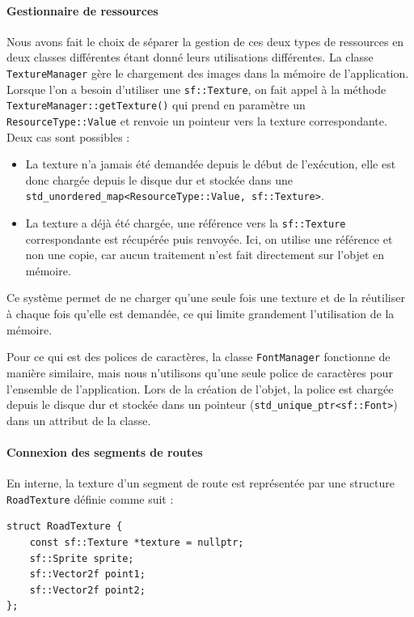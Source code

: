\paragraph{Gestionnaire de ressources}
Nous avons fait le choix de séparer la gestion de ces deux types de ressources en deux classes différentes étant donné leurs utilisations différentes.
La classe \texttt{TextureManager} gère le chargement des images dans la mémoire de l'application.
Lorsque l'on a besoin d'utiliser une \texttt{sf::Texture}\cite{sfml_sf_texture}, on fait appel à la méthode \texttt{TextureManager::getTexture()} qui prend en paramètre un \texttt{ResourceType::Value} et renvoie un pointeur vers la texture correspondante.
Deux cas sont possibles :
\begin{itemize}
    \item La texture n'a jamais été demandée depuis le début de l'exécution, elle est donc chargée depuis le disque dur et stockée dans une \texttt{\gls{std_unordered_map}<ResourceType::Value, sf::Texture>}\cite{cpp_reference_std_unordered_map}.
    \item La texture a déjà été chargée, une référence vers la \texttt{sf::Texture}\cite{sfml_sf_texture} correspondante est récupérée puis renvoyée.
    Ici, on utilise une référence et non une copie, car aucun traitement n'est fait directement sur l'objet en mémoire.
\end{itemize}
Ce système permet de ne charger qu'une seule fois une texture et de la réutiliser à chaque fois qu'elle est demandée, ce qui limite grandement l'utilisation de la mémoire.

Pour ce qui est des polices de caractères, la classe \texttt{FontManager} fonctionne de manière similaire, mais nous n'utilisons qu'une seule police de caractères pour l'ensemble de l'application.
Lors de la création de l'objet, la police est chargée depuis le disque dur et stockée dans un pointeur (\texttt{\gls{std_unique_ptr}<sf::Font>}\cite{cpp_reference_std_unique_ptr}) dans un attribut de la classe.

\paragraph{Connexion des segments de routes}
En interne, la texture d'un segment de route est représentée par une structure \texttt{RoadTexture} définie comme suit :

\begin{lstlisting}[style=CStyle,label={lst:struct_roadtexture}]
struct RoadTexture {
    const sf::Texture *texture = nullptr;
    sf::Sprite sprite;
    sf::Vector2f point1;
    sf::Vector2f point2;
};
\end{lstlisting}

